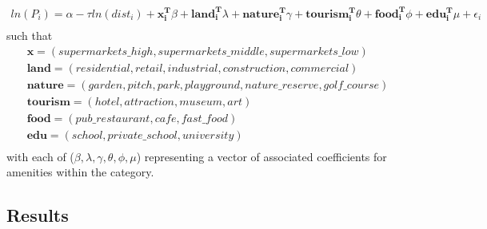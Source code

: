 \documentclass{article}
\begin{document}
\begin{gather*}
ln(P_i) = \alpha - \tau ln(dist_i) + \boldsymbol{x_i^{T}} \beta + \boldsymbol{land_i^{T}}\lambda + \boldsymbol{nature_i^{T}} \gamma + \boldsymbol{tourism_i^{T}} \theta + \boldsymbol{food_i^{T}} \phi + \boldsymbol{edu_i^{T}} \mu + \epsilon_i \\
\end{gather*}
such that
\begin{gather*}
\boldsymbol{x} = (supermarkets\_high, supermarkets\_middle, supermarkets\_low) \\
\boldsymbol{land} = (residential, retail, industrial, construction, commercial) \\
\boldsymbol{nature} = (garden, pitch, park, playground, nature\_reserve, golf\_course) \\
\boldsymbol{tourism} = (hotel, attraction, museum, art) \\
\boldsymbol{food} = (pub\_restaurant, cafe, fast\_food) \\ 
\boldsymbol{edu} = (school, private\_school, university) \\ 
\end{gather*}
with each of ($\beta, \lambda, \gamma, \theta, \phi, \mu$) representing a vector of associated coefficients for amenities within the category.  

\subsection{Results}
\end{document}
